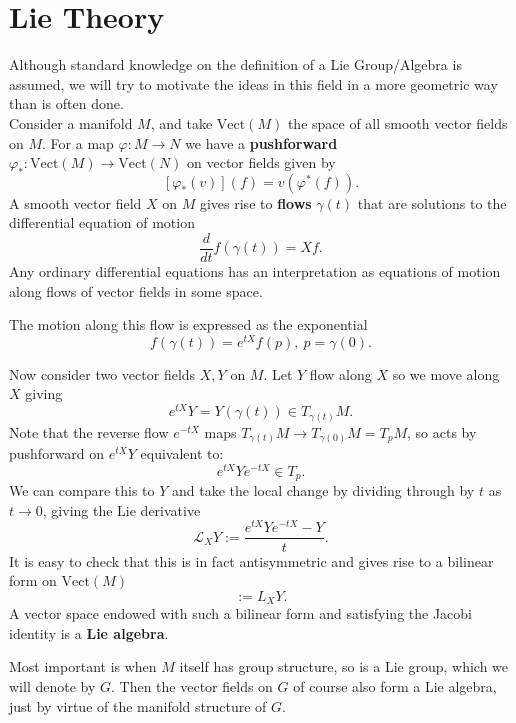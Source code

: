 		\section{Lie Theory} %
		\label{sec:lie_theory}
		
		
		Although standard knowledge on the definition of a Lie Group/Algebra is assumed, we will try to motivate the ideas in this field in a more geometric way than is often done. \\
		
		Consider a manifold $M$, and take $\text{Vect}(M)$ the space of all smooth vector fields on $M$. For a map $\varphi: M \rightarrow N$ we have a \textbf{pushforward} $\varphi_*: \text{Vect}(M) \rightarrow \text{Vect}(N)$ on vector fields given by
		\[
			[\varphi_* (v)] (f) = v (\varphi^* (f)).
		\]
		A smooth vector field $X$ on $M$ gives rise to \textbf{flows} $\gamma(t)$ that are solutions to the differential equation of motion
		\[
			\frac{d}{dt} f(\gamma(t)) = X f.
		\]
		Any ordinary differential equations has an interpretation as equations of motion along flows of vector fields in some space.  
		
		The motion along this flow is expressed as the exponential
		\[
			f(\gamma(t)) = e^{t X} f(p), ~ p = \gamma(0).
		\]
		
		Now consider two vector fields $X,Y$ on $M$. Let $Y$ flow along $X$ so we move along $X$ giving
		\[
			e^{tX} Y = Y(\gamma(t)) \in T_{\gamma(t)}M.
		\]
		Note that the reverse flow $e^{-t X}$ maps $T_{\gamma(t)} M \to T_{\gamma(0)}M = T_pM$, so acts by pushforward on $e^{tX} Y$ equivalent to:
		\[
			e^{tX} Y e^{-tX} \in T_p.
		\]
		We can compare this to $Y$ and take the local change by dividing through by $t$ as $t \to 0$, giving the Lie derivative
		\begin{equation}
			\mathcal L_X Y := \frac{e^{tX} Y e^{-tX} - Y}{t}.
		\end{equation}
		It is easy to check that this is in fact antisymmetric and gives rise to a bilinear form on $\mathrm{Vect}(M)$
		\begin{equation}
			[X,Y]:= L_X Y.
		\end{equation}
		A vector space endowed with such a bilinear form and satisfying the Jacobi identity is a \textbf{Lie algebra}.
		
		Most important is when $M$ itself has group structure, so is a Lie group, which we will denote by $G$. Then the vector fields on $G$ of course also form a Lie algebra, just by virtue of the manifold structure of $G$. 
		
